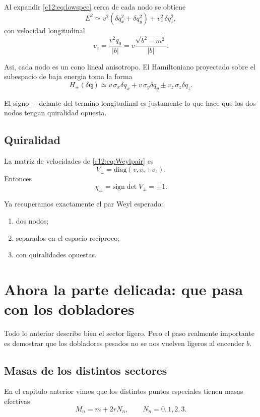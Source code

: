 Al expandir \eqref{c12:eq:lowspec} cerca de cada nodo se obtiene
\begin{equation}
E^2 \simeq
v^2(\delta q_x^2+\delta q_y^2)
+
v_z^2\,\delta q_z^2,
\end{equation}
con velocidad longitudinal
\begin{equation}
v_z = \frac{v^2 q_0}{|b|}
=
v\frac{\sqrt{b^2-m^2}}{|b|}.
\label{c12:eq:vz}
\end{equation}

Asi, cada nodo es un cono lineal anisotropo. El Hamiltoniano proyectado sobre el subespacio de baja energia toma la forma
\begin{equation}
H_\pm(\delta \bm{q})
\simeq
v\,\sigma_x \delta q_x
+
v\,\sigma_y \delta q_y
\pm
v_z\,\sigma_z \delta q_z.
\label{c12:eq:Weylpair}
\end{equation}

El signo \(\pm\) delante del termino longitudinal es justamente lo que hace que los dos nodos tengan quiralidad opuesta.

\subsection{Quiralidad}
La matriz de velocidades de \eqref{c12:eq:Weylpair} es
\begin{equation}
V_\pm = \mathrm{diag}(v,v,\pm v_z).
\end{equation}
Entonces
\begin{equation}
\chi_\pm = \mathrm{sign}\det V_\pm = \pm 1.
\end{equation}

Ya recuperamos exactamente el par Weyl esperado:
\begin{enumerate}[label=\arabic*.]
    \item dos nodos;
    \item separados en el espacio recíproco;
    \item con quiralidades opuestas.
\end{enumerate}

\section{Ahora la parte delicada: que pasa con los dobladores}
Todo lo anterior describe bien el sector ligero. Pero el paso realmente importante es demostrar que los dobladores pesados no se nos vuelven ligeros al encender \(b\).

\subsection{Masas de los distintos sectores}
En el capitulo anterior vimos que los distintos puntos especiales tienen masas efectivas
\begin{equation}
M_n = m + 2rN_n,
\qquad
N_n=0,1,2,3.
\label{c12:eq:Mn}
\end{equation}

